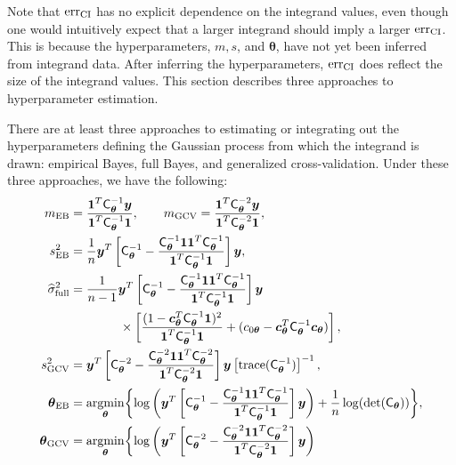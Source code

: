 \documentclass{svjour3}                     %
\newcommand{\bm}[1]{\boldsymbol{#1}}
\newcommand{\trace}[1]{\textup{trace}{#1}}
\newcommand{\vtheta}{{\bm{\theta}}}
\newcommand{\vc}{\bm{c}}
\newcommand{\vy}{\bm{y}}
\newcommand{\vone}{\bm{1}}
\newcommand{\mC}{\mathsf{C}}
\newcommand{\mCInv}{\mathsf{C}^{-1}}
\newcommand{\hsigma}{\widehat{\sigma}}
\newcommand{\MLE}{\textup{EB}}
\newcommand{\full}{\textup{full}}
\newcommand{\GCV}{\textup{GCV}}
\newcommand{\err}{\textup{err}}
\providecommand{\argmin}{\operatorname*{argmin}}
\begin{document}
Note that $\err_{\textup{CI}}$ has no explicit dependence on the integrand values, even though one would intuitively expect that a larger integrand should imply a  larger $\err_{\textup{CI}}$.  This is because the hyperparameters, $m, s$, and $\vtheta$, have not yet been inferred from integrand data.  After inferring the hyperparameters, $\err_{\textup{CI}}$ does reflect the size of the integrand values. This section describes three approaches to hyperparameter estimation.

\begin{theorem} \label{thm:param} There are at least three approaches to estimating or integrating out the hyperparameters defining the Gaussian process from which the integrand is drawn: empirical Bayes, full Bayes, and generalized cross-validation.  Under these three approaches, we have the following:
\begin{align}
    \label{eqn_m_MLE}
m_\MLE &= \frac{\vone^T \mCInv_\vtheta \vy }{ \vone^T \mCInv_\vtheta \vone}, \qquad
m_{\textup{GCV}} = \frac{\vone^T \mC_\vtheta^{-2} \vy}{\vone^T \mC_\vtheta^{-2} \vone}, \\
\label{eqn_s2_MLE}
s^2_{\MLE} 
&= 
\frac{1}{n}
\vy^T 
\left[ \mCInv_\vtheta - 
\frac{ \mCInv_\vtheta \vone \vone^T \mCInv_\vtheta }{\vone^T\mCInv_\vtheta \vone}
\right] \vy, \\
\nonumber
\hsigma_{\full}^2 
& = \frac{1}{n-1}
\vy^T\left[ \mC_\vtheta^{-1} 
- \frac{ \mC_\vtheta^{-1} \vone\vone^T \mC_\vtheta^{-1}}{\vone^T \mC_\vtheta^{-1} \vone}  \right]\vy
\\ 
\label{eqn:sigma2_full}
& \qquad \qquad \times  \left[\frac{(1 - \vc_{\vtheta}^T \mC_\vtheta^{-1} \vone)^2}{\vone^T \mC_\vtheta^{-1} \vone} + (c_{0\vtheta}  -\vc_{\vtheta} ^T \mC_\vtheta^{-1} \vc_{\vtheta}) \right], \\
\nonumber
 s^2_{\textup{GCV}} & = \vy^T \left[\mC_\vtheta^{-2} - \frac{\mC_\vtheta^{-2} \vone \vone^T \mC_\vtheta^{-2}}{\vone^T \mC_\vtheta^{-2} \vone}  \right] \vy  \left[ \trace(\mC_\vtheta^{-1}) \right]^{-1}, \\
\label{eqn:thetaMLE}
\vtheta_\MLE
&= \argmin_{\vtheta} \biggl \{
\log\left(\vy^T 
\left[ \mC_\vtheta^{-1} - 
\frac{ \mCInv_\vtheta \vone \vone^T \mCInv_\vtheta }{\vone^T\mCInv_\vtheta \vone}
\right] \vy 
\right)  
 +  \frac{1}{n} \log(\det(\mC_\vtheta))
\biggr \}, \\
\label{vthetaGCV}
\vtheta_{\GCV} &= \argmin_\vtheta \biggl\{\log \left(  \vy^T \left[\mC^{-2}_\vtheta - \frac{\mC^{-2}_\vtheta \vone \vone^T \mC^{-2}_\vtheta}{\vone^T \mC^{-2}_\vtheta \vone}  \right] \vy \right)  

\end{align}
\end{theorem}
\end{document}
